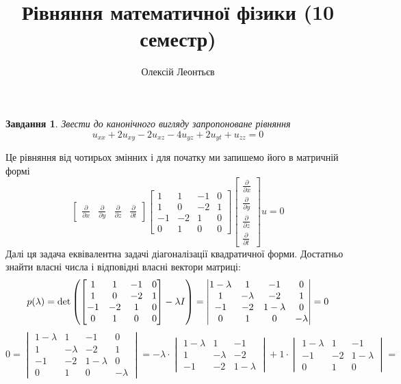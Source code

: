 \documentclass[12pt]{article} %
\title{Рівняння математичної фізики (10 семестр)}
\author{Олексій Леонтьєв}
\newtheorem{prob}{Завдання}
\newcommand{\dt}{\;dt}
\newcommand{\dx}{\;dx}
\begin{document}
\def\dx{\Delta x}
\def\dt{\Delta t}
\def\dX{\frac{\partial}{\partial x}}
\maketitle
\begin{prob}Звести до канонічного вигляду запропоноване рівняння
	\[u_{xx}+2u_{xy}-2u_{xz}-4u_{yz}+2u_{yt}+u_{zz}=0\]
\end{prob}
Це рівняння від чотирьох змінних і для початку ми запишемо його в матричній формі
\newcommand{\px}{\frac{\partial}{\partial x}}
\newcommand{\py}{\frac{\partial}{\partial y}}
\newcommand{\pz}{\frac{\partial}{\partial z}}
\newcommand{\pt}{\frac{\partial}{\partial t}}
\[\begin{bmatrix}\px&\py&\pz&\pt
\end{bmatrix}\begin{bmatrix}1&1&-1&0\\1&0&-2&1\\-1&-2&1&0\\0&1&0&0\end{bmatrix}\begin{bmatrix}\px\\\py\\\pz\\\pt\end{bmatrix}u=0\]
Далі ця задача еквівалентна задачі діагоналізації квадратичної форми. Достатньо знайти власні числа і відповідні власні вектори матриці:
\[p(\lambda)=\det\left(\begin{bmatrix}1&1&-1&0\\1&0&-2&1\\-1&-2&1&0\\0&1&0&0\end{bmatrix}-\lambda I\right)=
\begin{vmatrix}1-\lambda&1&-1&0\\1&-\lambda&-2&1\\-1&-2&1-\lambda&0\\0&1&0&-\lambda\end{vmatrix}=0\]
\[0=\begin{vmatrix}1-\lambda&1&-1&0\\1&-\lambda&-2&1\\-1&-2&1-\lambda&0\\0&1&0&-\lambda\end{vmatrix}=-\lambda\cdot\begin{vmatrix}1-\lambda&1&-1\\
1&-\lambda&-2\\-1&-2&1-\lambda\end{vmatrix}+1\cdot\begin{vmatrix}1-\lambda&1&-1\\-1&-2&1-\lambda\\0&1&0\end{vmatrix}=\]
\end{document}
